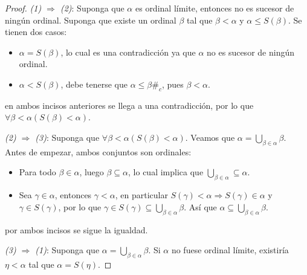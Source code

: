 \documentclass[12pt]{report}
\newcounter{it}
\theoremstyle{largebreak}
\newcommand\contradiction{\ensuremath{\#_c}}
\begin{document}
    \begin{proof}
        \textit{(1) $\Rightarrow$ (2)}: Suponga que $\alpha$ es ordinal límite, entonces no es sucesor de ningún ordinal. Suponga que existe un ordinal $\beta$ tal que $\beta<\alpha$ y $\alpha\leq S(\beta)$. Se tienen dos casos:
        \begin{itemize}
            \item $\alpha=S(\beta)$, lo cual es una contradicción ya que $\alpha$ no es sucesor de ningún ordinal.
            \item $\alpha<S(\beta)$, debe tenerse que $\alpha\leq\beta$\contradiction, pues $\beta<\alpha$.
        \end{itemize}
        en ambos incisos anteriores se llega a una contradicción, por lo que $\forall\beta<\alpha(S(\beta)<\alpha)$.

        \textit{(2) $\Rightarrow$ (3)}: Suponga que $\forall\beta<\alpha(S(\beta)<\alpha)$. Veamos que $\alpha=\bigcup_{\beta\in\alpha}\beta$. Antes de empezar, ambos conjuntos son ordinales:
        \begin{itemize}
            \item Para todo $\beta\in\alpha$, luego $\beta\subseteq\alpha$, lo cual implica que $\bigcup_{\beta\in\alpha}\subseteq\alpha$.
            \item Sea $\gamma\in\alpha$, entonces $\gamma<\alpha$, en particular $S(\gamma)<\alpha\Rightarrow S(\gamma)\in\alpha$ y $\gamma\in S(\gamma)$, por lo que $\gamma\in S(\gamma)\subseteq\bigcup_{\beta\in\alpha}\beta$. Así que $\alpha\subseteq\bigcup_{\beta\in\alpha}\beta$.
        \end{itemize}
        por ambos incisos se sigue la igualdad.

        \textit{(3) $\Rightarrow$ (1)}: Suponga que $\alpha=\bigcup_{\beta\in\alpha}\beta$. Si $\alpha$ no fuese ordinal límite, existiría $\eta<\alpha$ tal que $\alpha=S(\eta)$.


\end{proof}
\end{document}
